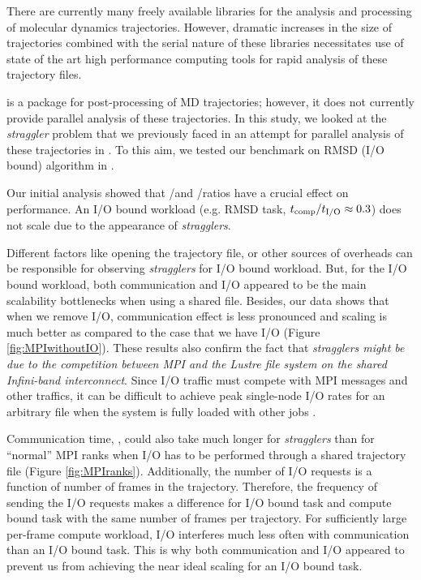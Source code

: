 \label{concl} 
There are currently many freely available libraries for the analysis and processing of molecular dynamics trajectories.
However, dramatic increases in the size of trajectories combined with the serial nature of these libraries necessitates 
use of state of the art high performance computing tools for rapid analysis of these trajectory files. 

 is a package for post-processing of MD trajectories; however, it does not currently provide parallel analysis of these trajectories.
In this study, we looked at the \emph{straggler} problem that we previously faced in an attempt for parallel analysis of these trajectories in  \cite{Khoshlessan:2017ab}.
To this aim, we tested our benchmark on RMSD (I/O bound) algorithm in .

Our initial analysis showed that \tcomp/\tIO and \tcomp/\tcomm ratios have a crucial effect on performance. 
An I/O bound workload (e.g. RMSD task, ${t}_{\text{comp}}/{t}_{\text{I/O}} \approx 0.3$) does not scale due to the appearance of \emph{stragglers}. 

Different factors like opening the trajectory file, or other sources of overheads can be responsible for observing \emph{stragglers} for I/O bound workload.
But, for the I/O bound workload, both communication and I/O appeared to be the main scalability bottlenecks when using a shared file.
Besides, our data shows that when we remove I/O, communication effect is less pronounced and scaling is much better as compared to the case that we have I/O (Figure \ref{fig:MPIwithoutIO}).
These results also confirm the fact that \emph{stragglers might be due to the competition between MPI and the Lustre file system on the shared Infini-band interconnect}.  
Since I/O traffic must compete with MPI messages and other traffics, it can be difficult to achieve peak single-node I/O rates for an arbitrary file when the system is fully loaded with other jobs \cite{VMD2013, Kevin2018}. 

Communication time, \tcomm, could also take much longer for \emph{stragglers} than for ``normal'' MPI ranks when I/O has to be performed through a shared trajectory file (Figure \ref{fig:MPIranks}). 
Additionally, the number of I/O requests is a function of number of frames in the trajectory. 
Therefore, the frequency of sending the I/O requests makes a difference for I/O bound task and compute bound task with the same number of frames per trajectory.
For sufficiently large per-frame compute workload, I/O interferes much less often with communication than an I/O bound task.
This is why both communication and I/O appeared to prevent us from achieving the near ideal scaling for an I/O bound task.

